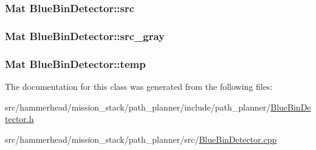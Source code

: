 \subsubsection[{\texorpdfstring{src}{src}}]{\setlength{\rightskip}{0pt plus 5cm}Mat Blue\+Bin\+Detector\+::src}\hypertarget{classBlueBinDetector_a7c504bb250864d343055259170b8fd34}{}\label{classBlueBinDetector_a7c504bb250864d343055259170b8fd34}
\subsubsection[{\texorpdfstring{src\+\_\+gray}{src_gray}}]{\setlength{\rightskip}{0pt plus 5cm}Mat Blue\+Bin\+Detector\+::src\+\_\+gray}\hypertarget{classBlueBinDetector_a87c0a2aee3ddf650aa602338fa39975a}{}\label{classBlueBinDetector_a87c0a2aee3ddf650aa602338fa39975a}
\subsubsection[{\texorpdfstring{temp}{temp}}]{\setlength{\rightskip}{0pt plus 5cm}Mat Blue\+Bin\+Detector\+::temp}\hypertarget{classBlueBinDetector_a65e2e4304509a31a7b8bf9b364d737c4}{}\label{classBlueBinDetector_a65e2e4304509a31a7b8bf9b364d737c4}


The documentation for this class was generated from the following files\+:\begin{DoxyCompactItemize}
\item 
src/hammerhead/mission\+\_\+stack/path\+\_\+planner/include/path\+\_\+planner/\hyperlink{BlueBinDetector_8h}{Blue\+Bin\+Detector.\+h}\item 
src/hammerhead/mission\+\_\+stack/path\+\_\+planner/src/\hyperlink{BlueBinDetector_8cpp}{Blue\+Bin\+Detector.\+cpp}\end{DoxyCompactItemize}
